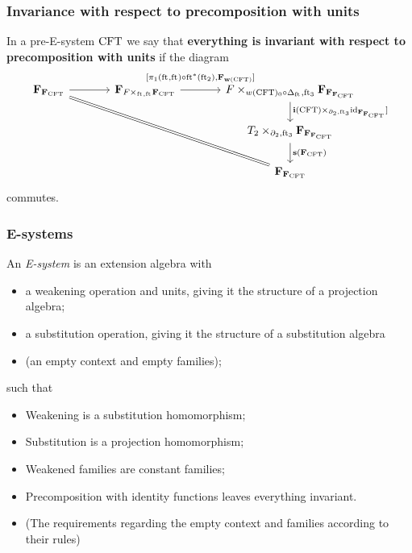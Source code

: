 \documentclass[handout]{beamer}
\newcommand\important[1]{\textbf{\color{red!90!black}#1}}
\begin{document}
\begin{frame}
\frametitle{\bf Invariance with respect to precomposition with units}
In a pre-E-system $\mathrm{CFT}$ we say that \important{everything is invariant
with respect to precomposition with units} if the diagram
\begin{equation*}
\begin{tikzcd}[ampersand replacement=\&,column sep=large]
\famesys{\famesys{\stesys}}
  \ar{r}
  \ar[equals]{ddrr}
  \&
\famesys{\cobesys{\stesysf}{\famesys{\stesys}}{\eft}{\eft}}
  \ar{r}[yshift=1ex]{[\pullbackpr{1}{\eft}{\eft}\circ\eft^\ast(\eft[2]),\famehom{\mathbf{w}(\stesys)}]}
  \&
\cobesys
  {\stesysf}
  {\famesys{\famesys{\famesys{\stesys}}}}
  {w(\stesys)_0\circ\Delta_{\eft}}
  {\eft[3]}
  \ar{d}{\pullback{\mathbf{i}(\stesys)}{\catid{\famesys{\famesys{\stesys}}}]}{\ebd[2]}{\eft[3]}}
  \\
  {}\&
  {}\&
\cobesys{\stesyst_2}{\famesys{\famesys{\famesys{\stesys}}}}{\ebd[2]}{\eft[3]}
  \ar{d}{\mathbf{s}(\famesys{\stesys})}
  \\
  {}\&
  {}\&
\famesys{\famesys{\stesys}}
\end{tikzcd}
\end{equation*}
commutes.
\end{frame}

\begin{frame}
\frametitle{\bf E-systems}
An \emph{E-system} is an extension algebra with
\begin{itemize}
\item a weakening operation and units, giving it the structure of a projection algebra;
\item a substitution operation, giving it the structure of a substitution algebra
\item (an empty context and empty families);
\end{itemize}
such that
\begin{itemize}
\item Weakening is a substitution homomorphism;
\item Substitution is a projection homomorphism;
\item Weakened families are constant families;
\item Precomposition with identity functions leaves everything invariant.
\item (The requirements regarding the empty context and families according to their rules)
\end{itemize}
\end{frame}
\end{document}
